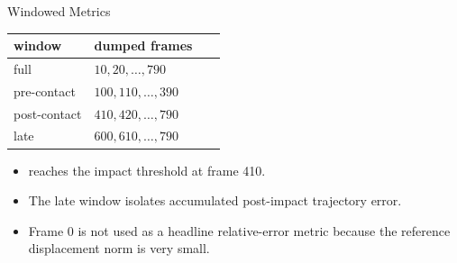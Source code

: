 \documentclass[aspectratio=169,10pt]{beamer}
\newcommand{\case}[1]{\texttt{\detokenize{#1}}}
\begin{document}
\begin{frame}{Windowed Metrics}
  \small
  \begin{table}
    \centering
    \begin{tabular}{lp{0.62\linewidth}}
      \toprule
      window & dumped frames \\
      \midrule
      full & $10,20,\ldots,790$ \\
      pre-contact & $100,110,\ldots,390$ \\
      post-contact & $410,420,\ldots,790$ \\
      late & $600,610,\ldots,790$ \\
      \bottomrule
    \end{tabular}
  \end{table}

  \vspace{0.8em}
  \begin{itemize}
    \item \case{tet_ref} reaches the impact threshold at frame 410.
    \item The late window isolates accumulated post-impact trajectory error.
    \item Frame 0 is not used as a headline relative-error metric because the
      reference displacement norm is very small.
  \end{itemize}
\end{frame}
\end{document}
